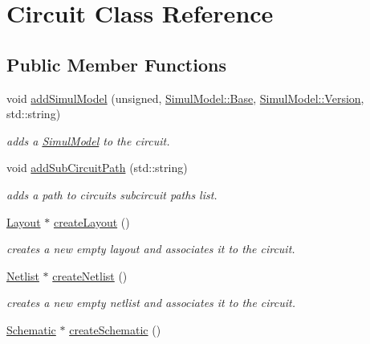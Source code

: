 \hypertarget{class_open_chams_1_1_circuit}{}\section{Circuit Class Reference}
\label{class_open_chams_1_1_circuit}
\subsection*{Public Member Functions}
\begin{DoxyCompactItemize}
\item 
void \hyperlink{class_open_chams_1_1_circuit_a7c1c09f44cf215dc17d3dd2518e32389}{add\+Simul\+Model} (unsigned, \hyperlink{class_open_chams_1_1_simul_model_a450696a95d6cb29d7723838846948340}{Simul\+Model\+::\+Base}, \hyperlink{class_open_chams_1_1_simul_model_a2256f5bba1c1c69a92b933aa501df470}{Simul\+Model\+::\+Version}, std\+::string)
\begin{DoxyCompactList}\small\item\em adds a \hyperlink{class_open_chams_1_1_simul_model}{Simul\+Model} to the circuit. \end{DoxyCompactList}\item 
void \hyperlink{class_open_chams_1_1_circuit_a55234deef1d06c617a519a575ce33608}{add\+Sub\+Circuit\+Path} (std\+::string)
\begin{DoxyCompactList}\small\item\em adds a path to circuit\textquotesingle{}s subcircuit paths list. \end{DoxyCompactList}\item 
\hyperlink{class_open_chams_1_1_layout}{Layout} $\ast$ \hyperlink{class_open_chams_1_1_circuit_a725a691b0117c4b913b54e7bfd92832f}{create\+Layout} ()
\begin{DoxyCompactList}\small\item\em creates a new empty layout and associates it to the circuit. \end{DoxyCompactList}\item 
\hyperlink{class_open_chams_1_1_netlist}{Netlist} $\ast$ \hyperlink{class_open_chams_1_1_circuit_a3f11671c7ea7b4e2cc3487bd7954b667}{create\+Netlist} ()
\begin{DoxyCompactList}\small\item\em creates a new empty netlist and associates it to the circuit. \end{DoxyCompactList}\item 
\hyperlink{class_open_chams_1_1_schematic}{Schematic} $\ast$ \hyperlink{class_open_chams_1_1_circuit_a57a79a9916df4512648bb195decb7250}{create\+Schematic} ()

\end{DoxyCompactItemize}
